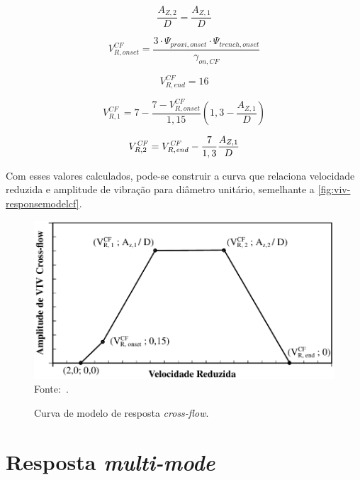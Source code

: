 \begin{equation}
\frac{A_{Z,2}}{D} = \frac{A_{Z,1}}{D}
\end{equation}

\begin{equation}
V_{R,\mathit{onset}}^\mathit{CF} = \frac{3 \cdot \Psi_{\mathit{proxi}, \mathit{onset}} \cdot  \Psi_{\mathit{trench}, \mathit{onset}}}{\gamma_{\mathit{on}, \mathit{CF}}}
\end{equation}

\begin{equation}
V_{R,\mathit{end}}^\mathit{CF} = 16
\end{equation}

\begin{equation}
V_{R, 1}^\mathit{CF} = 7 - \frac{7 - V^\mathit{CF}_{R, \mathit{onset}}}{1,15} \left(1,3 - \frac{A_{Z,1}}{D}\right)
\end{equation}

\begin{equation}
V_{R, 2}^\mathit{CF} = V^\mathit{CF}_{R, \mathit{end}} - \frac{7}{1,3} \frac{A_{Z, 1}}{D}\\
\end{equation}

Com esses valores calculados, pode-se construir a curva que relaciona velocidade reduzida e amplitude de vibração para diâmetro unitário, semelhante a \autoref{fig:viv-responsemodelcf}.

\begin{figure}[th!]
    \centering
    \caption{Curva de modelo de resposta \textit{cross-flow}.}\label{fig:viv-responsemodelcf}
    \includegraphics[width=0.8\linewidth]{imagens/response_model_CF}
    \\Fonte:~.
\end{figure}


\section{\label{sec:multimode}Resposta \textit{multi-mode}}

